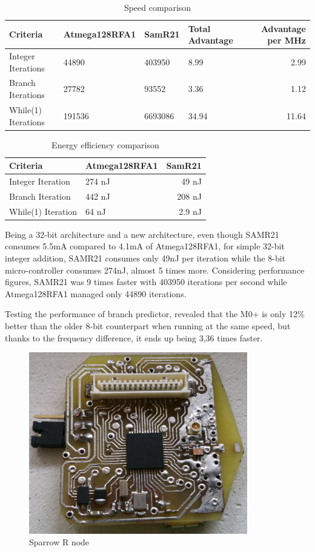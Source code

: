 \begin{table} \centering
\begin{tabular}{llllr}
\hline
Criteria    & Atmega128RFA1 & SamR21 & Total Advantage & Advantage per MHz \\
\hline
Integer Iterations      & 44890    & 403950   & 8.99 &  2.99 \\
Branch Iterations      & 27782    & 93552  &  3.36 &  1.12  \\
While(1) Iterations          & 191536     & 6693086    & 34.94  & 11.64  \\
\hline
\hline
\end{tabular}
\caption{Speed comparison}
\end{table}

\begin{table} \centering
\begin{tabular}{llr}
\hline
Criteria    & Atmega128RFA1 & SamR21 \\
\hline
Integer Iteration    &  274 nJ & 49 nJ \\
Branch Iteration      & 442 nJ & 208 nJ  \\
While(1) Iteration          & 64 nJ & 2.9 nJ \\
\hline
\hline
\end{tabular}
\caption{Energy efficiency comparison}
\end{table}

Being a 32-bit architecture and a new architecture, even though SAMR21 consumes 5.5mA
compared to 4.1mA of Atmega128RFA1, for simple 32-bit integer addition, SAMR21 consumes only 49nJ
per iteration while the 8-bit micro-controller consumes 274nJ, almost 5 times more. Considering
performance figures, SAMR21 was 9 times faster with 403950 iterations per second while
Atmega128RFA1 managed only 44890 iterations.

Testing the performance of branch predictor, revealed that the M0+ is only 12\% better than
the older 8-bit counterpart when running at the same speed, but thanks to the frequency difference, it ends up being 3,36 times
faster.


\begin{figure}[ht] \centering
\includegraphics[width=0.85\textwidth]{img/sparrowrf.jpg}
\caption{Sparrow R node}
\end{figure}

